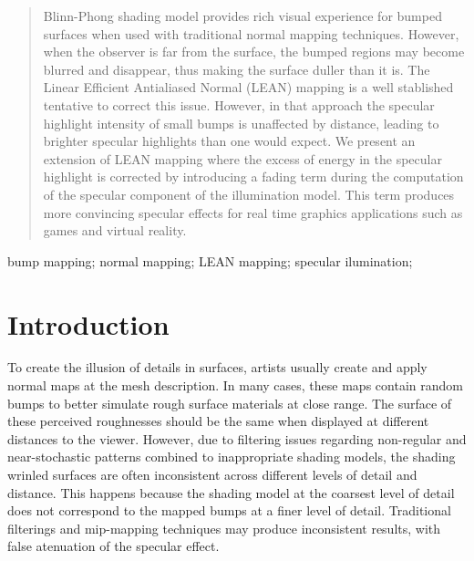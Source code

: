 \documentclass[10pt, conference]{IEEEtran}
\begin{document}
\begin{abstract}
Blinn-Phong shading model provides rich visual experience for bumped surfaces when used with traditional normal mapping techniques. However, when the observer is far from the surface, the bumped regions may become blurred and disappear, thus making the surface duller than it is. The Linear Efficient Antialiased Normal (LEAN) mapping is a well stablished tentative to correct this issue. However, in that approach the specular highlight intensity of small bumps is unaffected by distance, leading to brighter specular highlights than one would expect. We present an extension of LEAN mapping where the excess of energy in the specular highlight is corrected by introducing a fading term during the computation of the specular component of the illumination model. This term produces more convincing specular effects for real time graphics applications such as games and virtual reality.

%
\end{abstract}

\begin{IEEEkeywords}
bump mapping; normal mapping; LEAN mapping; specular ilumination;

\end{IEEEkeywords}


\IEEEpeerreviewmaketitle





\section{Introduction}
%
To create the illusion of details in surfaces, artists usually create and apply normal maps at the mesh description. In many cases, these maps contain random bumps to better simulate rough surface materials at close range. The surface of these perceived roughnesses should be the same when displayed at different distances to the viewer. However, due to filtering issues regarding non-regular and near-stochastic patterns combined to inappropriate shading models, the shading wrinled surfaces are often inconsistent across different levels of detail and distance. This happens because the shading model at the coarsest level of detail does not correspond to the mapped bumps at a finer level of detail. Traditional filterings and mip-mapping techniques may produce inconsistent results, with false atenuation of the specular effect.
\end{document}
